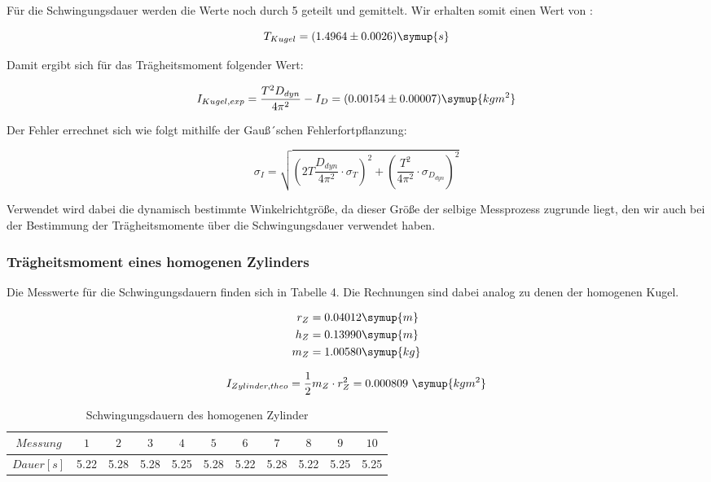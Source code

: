 Für die Schwingungsdauer werden die Werte noch durch 5 geteilt und gemittelt. Wir erhalten somit einen Wert von :

\begin{equation}
  T_{Kugel} = (1.4964 \pm 0.0026) \symup{s}
\end{equation}

Damit ergibt sich für das Trägheitsmoment folgender Wert:

\begin{equation}
  I_{Kugel,exp} = \frac{T^2 D_{dyn}}{4\pi^2} - I_D = (0.00154 \pm 0.00007) \symup{kg m^2}
\end{equation}

Der Fehler errechnet sich wie folgt mithilfe der Gauß´schen Fehlerfortpflanzung:

\begin{equation}
  \sigma_I = \sqrt{(2T \frac{D_{dyn}}{4\pi^2} \cdot \sigma_T)^2 + (\frac{T^2}{4\pi^2} \cdot \sigma_{D_{dyn}})^2}
    \label{eqn:sigma}
\end{equation}

Verwendet wird dabei die dynamisch bestimmte Winkelrichtgröße, da dieser Größe der selbige
Messprozess zugrunde liegt, den wir auch bei der Bestimmung der Trägheitsmomente über die
Schwingungsdauer verwendet haben.

\subsubsection{Trägheitsmoment eines homogenen Zylinders}

Die Messwerte für die Schwingungsdauern finden sich in Tabelle 4. Die Rechnungen sind dabei analog
zu denen der homogenen Kugel.

\begin{align}
  r_Z &= 0.04012  \symup{m} \\
  h_Z &= 0.13990  \symup{m} \\
  m_Z &= 1.00580  \symup{kg}
\end{align}

\begin{equation}
  I_{Zylinder,theo} = \frac{1}{2} m_Z \cdot r_Z^2 = 0.000809 \,\, \symup{kg m^2}
\end{equation}

\begin{table}
  \centering
  \caption{Schwingungsdauern des homogenen Zylinder}
  \begin{tabular}{c c c c c c c c c c c}
    \toprule $Messung$ & $1$ & $2$ & $3$ & $4$ & $5$ & $6$ & $7$ & $8$ & $9$ & $10$ \\
    \midrule $Dauer [s]$ & 5.22 & 5.28 & 5.28 & 5.25 & 5.28 & 5.22 & 5.28 & 5.22 & 5.25 & 5.25\\
    \bottomrule
  \end{tabular}
\end{table}

